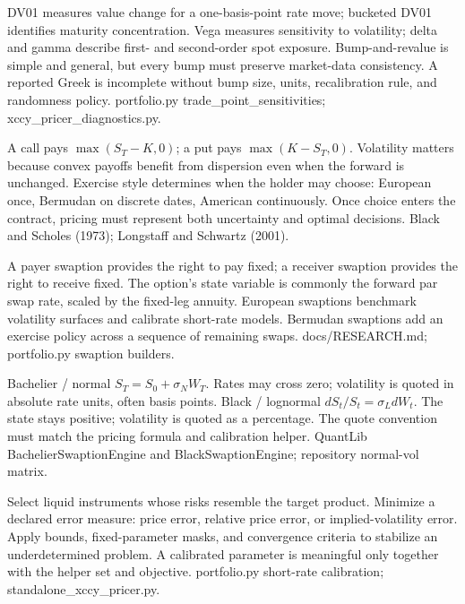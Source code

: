 {DV01 measures value change for a one-basis-point rate move; bucketed DV01 identifies maturity concentration.}
{Vega measures sensitivity to volatility; delta and gamma describe first- and second-order spot exposure.}
{Bump-and-revalue is simple and general, but every bump must preserve market-data consistency.}
{A reported Greek is incomplete without bump size, units, recalibration rule, and randomness policy.}
{portfolio.py trade\_point\_sensitivities; xccy\_pricer\_diagnostics.py.}

{A call pays $\max(S_T-K,0)$; a put pays $\max(K-S_T,0)$.}
{Volatility matters because convex payoffs benefit from dispersion even when the forward is unchanged.}
{Exercise style determines when the holder may choose: European once, Bermudan on discrete dates, American continuously.}
{Once choice enters the contract, pricing must represent both uncertainty and optimal decisions.}
{Black and Scholes (1973); Longstaff and Schwartz (2001).}

{A payer swaption provides the right to pay fixed; a receiver swaption provides the right to receive fixed.}
{The option's state variable is commonly the forward par swap rate, scaled by the fixed-leg annuity.}
{European swaptions benchmark volatility surfaces and calibrate short-rate models.}
{Bermudan swaptions add an exercise policy across a sequence of remaining swaps.}
{docs/RESEARCH.md; portfolio.py swaption builders.}

{Bachelier / normal}
{$S_T=S_0+\sigma_N W_T$. Rates may cross zero; volatility is quoted in absolute rate units, often basis points.}
{Black / lognormal}
{$dS_t/S_t=\sigma_LdW_t$. The state stays positive; volatility is quoted as a percentage.}
{The quote convention must match the pricing formula and calibration helper.}
{QuantLib BachelierSwaptionEngine and BlackSwaptionEngine; repository normal-vol matrix.}

{Select liquid instruments whose risks resemble the target product.}
{Minimize a declared error measure: price error, relative price error, or implied-volatility error.}
{Apply bounds, fixed-parameter masks, and convergence criteria to stabilize an underdetermined problem.}
{A calibrated parameter is meaningful only together with the helper set and objective.}
{portfolio.py short-rate calibration; standalone\_xccy\_pricer.py.}

